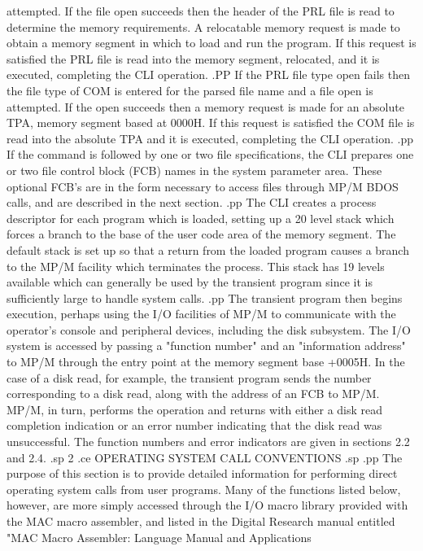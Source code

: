 attempted.  If the file open succeeds then the header of the PRL
file is read to determine the memory requirements.
A relocatable memory request is made to obtain a memory segment in
which to load and run the program.  If this request is satisfied
the PRL file is read into the memory segment, relocated, and it is
executed, completing the CLI operation.
.PP
If the PRL file type open fails then the file type of COM is entered
for the parsed file name and a file open is attempted.  If the open
succeeds then a memory request is made for an absolute TPA, memory
segment based at 0000H.  If this request is satisfied the COM file is
read into the absolute TPA and it is executed, completing the CLI
operation.
.pp
If the command is followed by one or two file specifications, the CLI
prepares one or two file control block (FCB) names in the system
parameter area.  These optional FCB's are in the form necessary
to access files through MP/M BDOS calls, and are described in
the next section.
.pp
The CLI creates a process descriptor for each program which is
loaded, setting up a 20 level stack which forces a branch to the base
of the user code area of the memory segment.  The default stack is
set up so that a return from the loaded program causes a branch
to the MP/M facility which terminates the process.
This stack has 19 levels available which can generally be used by the transient
program since it is sufficiently large to handle system calls.
.pp
The transient program then begins execution,
perhaps using the I/O facilities of MP/M to communicate
with the operator's console and peripheral devices, including
the disk subsystem.  The I/O system is accessed by passing a
"function number" and an "information address" to MP/M through
the entry point at the memory segment base +0005H.  In the case of a
disk
read, for example, the transient program sends the number corresponding
to a disk read, along with the address of an FCB to MP/M.
MP/M, in turn, performs the operation and returns with either
a disk read completion indication or an error number indicating
that the disk read was unsuccessful.  The function numbers and
error indicators are given in sections 2.2 and 2.4.
.sp 2
.ce
OPERATING SYSTEM CALL CONVENTIONS
.sp
.pp
The purpose of this section is to provide detailed information
for performing direct operating system calls from user programs.
Many of the functions listed below, however, are more simply
accessed through the I/O macro library provided with the MAC
macro assembler, and listed in the Digital Research manual
entitled "MAC Macro Assembler: Language Manual and Applications
